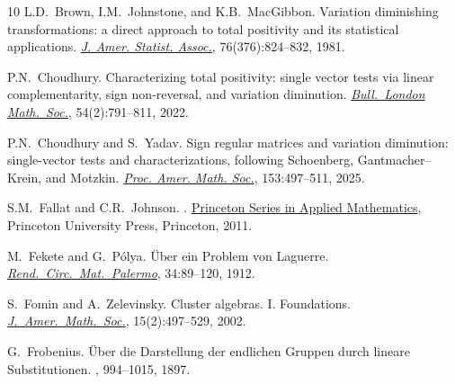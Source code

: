 \documentclass[11pt,reqno]{amsart}
\theoremstyle{plain}
\theoremstyle{definition}
\numberwithin{equation}{section}
\begin{document}
\begin{thebibliography}{10}
		L.D.~Brown, I.M.~Johnstone, and K.B.~MacGibbon.
		\newblock Variation diminishing transformations: a direct approach to total positivity and its statistical applications.
		\newblock \href{https://doi.org/10.2307/2287577 }
		{\em J. Amer. Statist. Assoc.}, 76(376):824--832, 1981.
		
		P.N.~Choudhury.
		\newblock Characterizing total positivity: single vector tests via linear complementarity, sign non-reversal, and variation diminution. \newblock \href{https://doi.org/10.1112/blms.12601}{\em Bull.\ London Math.\ Soc.}, 54(2):791--811, 2022.
	   
	   P.N.~Choudhury and S.~Yadav.
	   \newblock Sign regular matrices and variation diminution: single-vector tests and characterizations, following Schoenberg, Gantmacher--Krein, and Motzkin.  \href{https://doi.org/10.1090/proc/17026}{\em Proc. Amer. Math. Soc.}, 153:497--511, 2025.
		
		
		S.M.~Fallat and C.R.~Johnson.
		.
		\newblock
		\href{https://press.princeton.edu/books/hardcover/9780691121574/totally-non-negative-matrices}{Princeton Series in Applied Mathematics}, Princeton University Press, Princeton, 2011.
		
		M.~Fekete and G.~P\'{o}lya.
		\newblock \"{U}ber ein {P}roblem von {L}aguerre.
		\newblock \href{http://dx.doi.org/10.1007/BF03015009}{\em Rend.\ Circ.\ Mat.\ Palermo}, 34:89--120, 1912.
		
		
		S.~Fomin and A.~Zelevinsky.
		\newblock Cluster algebras. {I}. {F}oundations.
		\newblock \href{http://dx.doi.org/10.1090/S0894-0347-01-00385-X}{\em J.\ Amer.\ Math.\ Soc.}, 15(2):497--529, 2002.
		
		G.~Frobenius.
		\newblock \"{U}ber die Darstellung der endlichen Gruppen durch lineare Substitutionen.
		, 994--1015, 1897.
		

\end{thebibliography}
\end{document}
